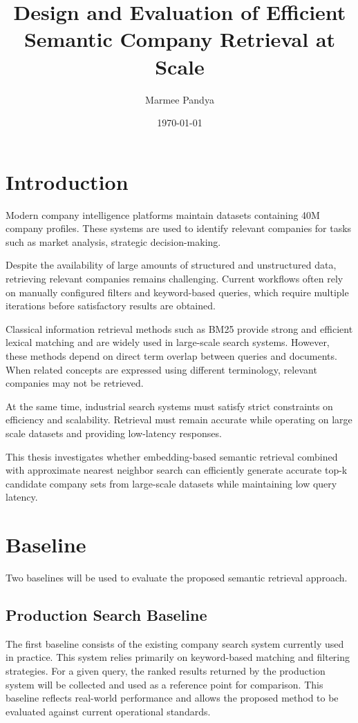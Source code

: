 \documentclass[a4paper]{scrartcl}
\title{Design and Evaluation of Efficient Semantic Company Retrieval at Scale}
\author{Marmee Pandya}
\date{\today}
\begin{document}
\maketitle

\section{Introduction}

Modern company intelligence platforms maintain datasets containing 40M company profiles. These systems are used to identify relevant companies for tasks such as market analysis, strategic decision-making.

Despite the availability of large amounts of structured and unstructured data, retrieving relevant companies remains challenging. Current workflows often rely on manually configured filters and keyword-based queries, which require multiple iterations before satisfactory results are obtained.

Classical information retrieval methods such as BM25 provide strong and efficient lexical matching and are widely used in large-scale search systems. However, these methods depend on direct term overlap between queries and documents. When related concepts are expressed using different terminology, relevant companies may not be retrieved.

At the same time, industrial search systems must satisfy strict constraints on efficiency and scalability. Retrieval must remain accurate while operating on large scale datasets and providing low-latency responses.

This thesis investigates whether embedding-based semantic retrieval combined with approximate nearest neighbor search can efficiently generate accurate top-k candidate company sets from large-scale datasets while maintaining low query latency.

\section{Baseline}

Two baselines will be used to evaluate the proposed semantic retrieval approach.

\subsection{Production Search Baseline}

The first baseline consists of the existing company search system currently used in practice. This system relies primarily on keyword-based matching and filtering strategies. For a given query, the ranked results returned by the production system will be collected and used as a reference point for comparison. This baseline reflects real-world performance and allows the proposed method to be evaluated against current operational standards.
\end{document}
